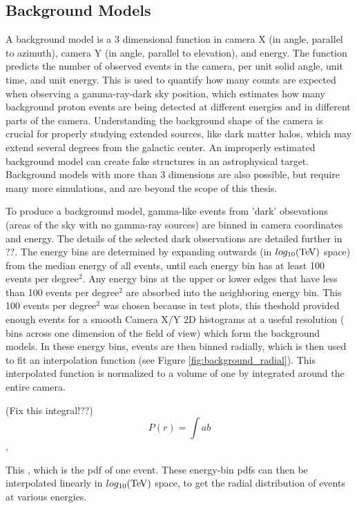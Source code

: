   \subsection{Background Models}\label{background_production}
    A background model is a 3 dimensional function in camera X (in angle, parallel to azimuth), camera Y (in angle, parallel to elevation), and energy.
    The function predicts the number of observed events in the camera, per unit solid angle, unit time, and unit energy.
    This is used to quantify how many counts are expected when observing a gamma-ray-dark sky position, which estimates how many background proton events are being detected at different energies and in different parts of the camera.
    Understanding the background shape of the camera is crucial for properly studying extended sources, like dark matter halos, which may extend several degrees from the galactic center.
    An improperly estimated background model can create fake structures in an astrophysical target.
    Background models with more than 3 dimensions are also possible, but require many more simulations, and are beyond the scope of this thesis.

    To produce a background model, gamma-like events from 'dark' obsevations (areas of the sky with no gamma-ray sources) are binned in camera coordinates and energy.
    The details of the selected dark observations are detailed further in ??.
    The energy bins are determined by expanding outwards (in $log_{10}(\TeV )$ space) from the median energy of all events, until each energy bin has at least 100 events per degree$^2$.
    Any energy bins at the upper or lower edges that have less than 100 events per degree$^2$ are absorbed into the neighboring energy bin.
    This 100 events per degree$^2$ was chosen because in test plots, this theshold provided enough events for a smooth Camera X/Y 2D histograms at a useful resolution ( bins across one dimension of the field of view) which form the background models.
    In these energy bins, events are then binned radially, which is then used to fit an interpolation function (see Figure \ref{fig:background_radial}).
    This interpolated function is normalized to a volume of one by integrated around the entire camera.

    (Fix this integral!??)
    \begin{equation}
      \label{eqn:background_integral}
      P(r) = \int{a}{b}
    \end{equation},

    This , which is the pdf of one event.
    These energy-bin pdfs can then be interpolated linearly in $log_{10}(\TeV )$ space, to get the radial distribution of events at various energies.

